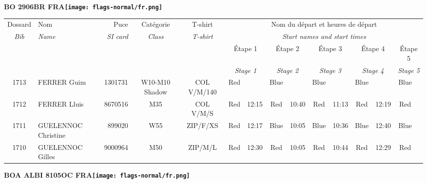 \documentclass{report}
\begin{document}
\newpage
  \Huge \centering \bfseries BO 2906BR FRA\normalfont \footnotesize \sffamily \hfill \texttt{[image: flags-normal/fr.png]} \newline 
  \begin{longtable}{|c|l|r|c|c|*{5}{cc|}}
    Dossard & Nom  & Puce    & Catégorie & T-shirt & \multicolumn{10}{c|}{Nom du départ et heures de départ} \\
    \itshape Bib     & \itshape Name & \itshape SI card & \itshape Class  & \itshape  T-shirt  & \multicolumn{10}{c|}{\itshape Start names and start times} \\
    \hline
    & & & & & \multicolumn{2}{c|}{Étape 1} & \multicolumn{2}{c|}{Étape 2} & \multicolumn{2}{c|}{Étape 3} & \multicolumn{2}{c|}{Étape 4} & \multicolumn{2}{c|}{Étape 5} \\
    & & & & & \multicolumn{2}{c|}{\itshape Stage 1} & \multicolumn{2}{c|}{\itshape Stage 2} & \multicolumn{2}{c|}{\itshape Stage 3} & \multicolumn{2}{c|}{\itshape Stage 4} & \multicolumn{2}{c|}{\itshape Stage 5} \\
    \hline
    1713 & FERRER Guim & 1301731 & W10-M10 Shadow & COL V/M/140 & Red &   & Blue &   & Blue &   & Blue &   & Blue &  \\
    1712 & FERRER Lluis & 8670516 & M35 & COL V/M/S & Red & 12:15 & Red & 10:40 & Red & 11:13 & Red & 12:19 & Red &  \\
    1711 & GUELENNOC Christine & 899020 & W55 & ZIP/F/XS & Red & 12:17 & Blue & 10:05 & Blue & 10:36 & Blue & 12:40 & Blue &  \\
    1710 & GUELENNOC Gilles & 9000964 & M50 & ZIP/M/L & Red & 12:30 & Red & 10:05 & Red & 10:44 & Red & 12:29 & Red &  \\
  \end{longtable}
\newpage
  \Huge \centering \bfseries BOA ALBI 8105OC FRA\normalfont \footnotesize \sffamily \hfill \texttt{[image: flags-normal/fr.png]} \newline 
\end{document}
